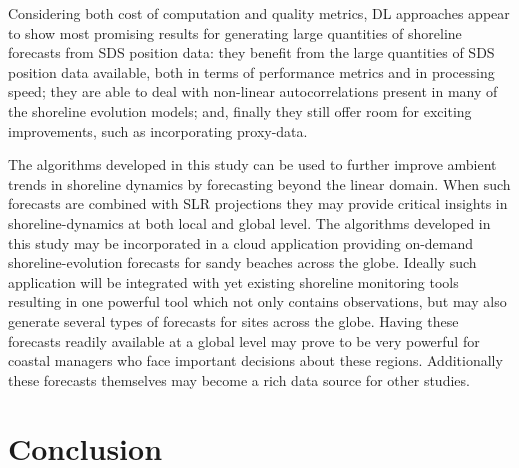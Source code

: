 \documentclass[format=sigconf, review=false, screen=true]{acmart}
\begin{document}
Considering both cost of computation and quality metrics, DL approaches appear to show most promising results for generating large quantities of shoreline forecasts from SDS position data: they benefit from the large quantities of SDS position data available, both in terms of performance metrics and in processing speed; they are able to deal with non-linear autocorrelations present in many of the shoreline evolution models; and, finally they still offer room for exciting improvements, such as incorporating proxy-data. 

The algorithms developed in this study can be used to further improve ambient trends in shoreline dynamics by forecasting beyond the linear domain. When such forecasts are combined with SLR projections they may provide critical insights in shoreline-dynamics at both local and global level. The algorithms developed in this study may be incorporated in a cloud application providing on-demand shoreline-evolution forecasts for sandy beaches across the globe. Ideally such application will be integrated with yet existing shoreline monitoring tools resulting in one powerful tool which not only contains observations, but may also generate several types of forecasts for sites across the globe. Having these forecasts readily available at a global level may prove to be very powerful for coastal managers who face important decisions about these regions. Additionally these forecasts themselves may become a rich data source for other studies.  
 




\section{Conclusion}
\end{document}
